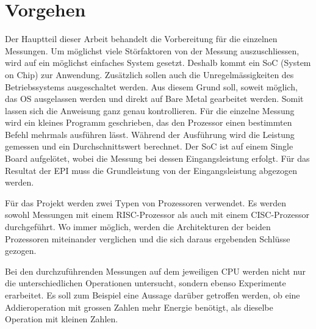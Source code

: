 \chapter{Vorgehen}

Der Hauptteil dieser Arbeit behandelt die Vorbereitung für die einzelnen Messungen. Um möglichst viele Störfaktoren
von der Messung auszuschliessen, wird auf ein möglichst einfaches System gesetzt. Deshalb kommt ein SoC
(System on Chip) zur Anwendung. Zusätzlich sollen auch die Unregelmässigkeiten des Betriebssystems ausgeschaltet
werden. Aus diesem Grund soll, soweit möglich, das OS ausgelassen werden und direkt auf Bare Metal gearbeitet werden.
Somit lassen sich die Anweisung ganz genau kontrollieren. Für die einzelne Messung wird ein kleines Programm geschrieben, das den Prozessor einen bestimmten Befehl mehrmals ausführen lässt. Während der Ausführung wird die Leistung gemessen und ein Durchschnittswert berechnet.
Der SoC ist auf einem Single Board aufgelötet, wobei
die Messung bei dessen Eingangsleistung erfolgt. Für das Resultat der EPI muss die Grundleistung von der Eingangsleistung abgezogen
werden.
\par
Für das Projekt werden zwei Typen von Prozessoren verwendet. Es werden sowohl Messungen mit einem RISC-Prozessor
als auch mit einem CISC-Prozessor durchgeführt. Wo immer möglich, werden die Architekturen der beiden Prozessoren miteinander verglichen
und die sich daraus ergebenden Schlüsse gezogen.
\par
Bei den durchzuführenden Messungen auf dem jeweiligen CPU werden nicht nur die unterschiedlichen Operationen untersucht, sondern ebenso 
Experimente erarbeitet. Es soll zum Beispiel eine Aussage darüber getroffen werden, ob eine Addieroperation
mit grossen Zahlen mehr Energie benötigt, als dieselbe Operation mit kleinen Zahlen.


